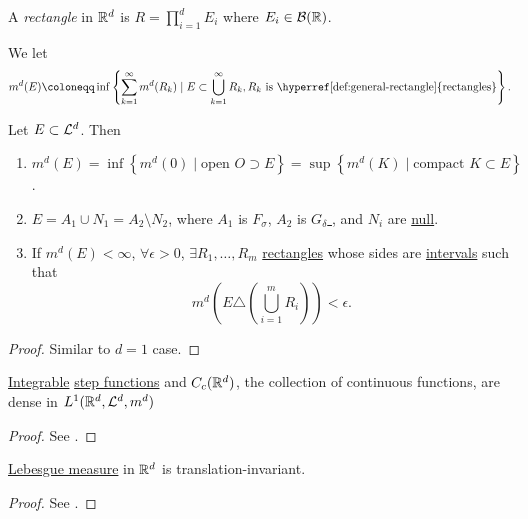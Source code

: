 \begin{definition}\label{def:general-rectangle}
	A \emph{rectangle} in \(\mathbb{\MakeUppercase{r}} ^d\) is \(R = \prod\limits_{i=1}^{d} E_{i} \) where \(E_{i}\in \mathcal{\MakeUppercase{b}} (\mathbb{\MakeUppercase{r}} )\).
\end{definition}

\begin{definition}
	We let
	\[
		m^d(E) \coloneqq \inf \left\{\sum\limits_{k=1}^{\infty} m^d(R_{k} )\mid E\subset \bigcup\limits_{k=1}^{\infty} R_{k} , R_{k} \text{ is \hyperref[def:general-rectangle]{rectangles}}\right\}.
	\]
\end{definition}
\begin{theorem}\label{thm:lec-20}
	Let \(E\subset \mathcal{\MakeUppercase{l}} ^d\). Then
	\begin{enumerate}
		\item \(m^d(E) = \inf \left\{m^d (0) \mid \text{open } O\supset E \right\} = \sup \left\{m^d (K)\mid \text{compact }K\subset E \right\}\).
		\item \(E = A_1 \cup N_1 = A_2 \setminus N_2\), where \(A_1\) is \hyperref[def:F-sigma-set]{\(F_\sigma \)}, \(A_2\) is \hyperref[def:G-delta-set]{\(G_\delta \) }, and \(N_{i} \) are \hyperref[def:mu-null-set]{null}.
		\item If \(m^d(E)<\infty \), \(\forall \epsilon >0\), \(\exists R_1, \ldots , R_m \) \hyperref[def:general-rectangle]{rectangles} whose sides are \underline{intervals} such that
		      \[
			      m^d \left(E\triangle \left(\bigcup\limits_{i=1}^{m} R_{i} \right)\right)< \epsilon .
		      \]
	\end{enumerate}
\end{theorem}
\begin{proof}
	Similar to \(d = 1\) case.
\end{proof}

\begin{theorem}
	\hyperref[def:integrable]{Integrable} \hyperref[def:step-function]{step functions} and \(C_c(\mathbb{\MakeUppercase{r}} ^d)\), the collection
	of continuous functions, are dense in \(L^1(\mathbb{\MakeUppercase{r}} ^d, \mathcal{\MakeUppercase{l}} ^d, m^d)\)
\end{theorem}
\begin{proof}
	See \cite{folland1999real}.
\end{proof}

\begin{theorem}
	\hyperref[def:Lebesgue-measure]{Lebesgue measure} in \(\mathbb{\MakeUppercase{r}} ^d\) is translation-invariant.
\end{theorem}
\begin{proof}
	See \cite{folland1999real}.
\end{proof}

